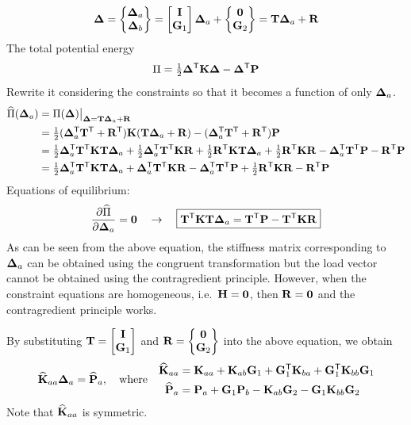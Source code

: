 \begin{equation}
  \bm{\Delta} = \begin{Bmatrix}\bm{\Delta}_a\\ \bm{\Delta}_b\end{Bmatrix} = \begin{bmatrix}\mathbf{I}\\ \mathbf{G}_1\end{bmatrix}\bm{\Delta}_a + \begin{Bmatrix}\mathbf{0}\\ \mathbf{G}_2\end{Bmatrix} = \mathbf{T}\bm{\Delta}_a + \mathbf{R}
\end{equation}
The total potential energy
\begin{equation*}
  \Pi = \tfrac12\bm{\Delta}^{\mathsf{T}}\mathbf{K}\bm{\Delta} - \bm{\Delta}^{\mathsf{T}}\mathbf{P}
\end{equation*}
Rewrite it considering the constraints so that it becomes a function of only $\bm{\Delta}_a$.
{\small\begin{equation*}
  \begin{aligned}
    \widehat\Pi(\bm{\Delta}_a) &= \Pi(\bm{\Delta})\big|_{\bm{\Delta} = \mathbf{T}\bm{\Delta}_a + \mathbf{R}}\\
    &= \tfrac12(\bm{\Delta}_a^{\mathsf{T}}\mathbf{T}^{\mathsf{T}} + \mathbf{R}^{\mathsf{T}})\mathbf{K}(\mathbf{T}\bm{\Delta}_a + \mathbf{R}) - (\bm{\Delta}_a^{\mathsf{T}}\mathbf{T}^{\mathsf{T}} + \mathbf{R}^{\mathsf{T}})\mathbf{P}\\
    &= \tfrac12\bm{\Delta}_a^{\mathsf{T}}\mathbf{T}^{\mathsf{T}}\mathbf{K}\mathbf{T}\bm{\Delta}_a + \tfrac12\bm{\Delta}_a^{\mathsf{T}}\mathbf{T}^{\mathsf{T}}\mathbf{K}\mathbf{R} + \tfrac12\mathbf{R}^{\mathsf{T}}\mathbf{K}\mathbf{T}\bm{\Delta}_a + \tfrac12\mathbf{R}^{\mathsf{T}}\mathbf{K}\mathbf{R} - \bm{\Delta}_a^{\mathsf{T}}\mathbf{T}^{\mathsf{T}}\mathbf{P} - \mathbf{R}^{\mathsf{T}}\mathbf{P}\\
    &= \tfrac12\bm{\Delta}_a^{\mathsf{T}}\mathbf{T}^{\mathsf{T}}\mathbf{K}\mathbf{T}\bm{\Delta}_a + \bm{\Delta}_a^{\mathsf{T}}\mathbf{T}^{\mathsf{T}}\mathbf{K}\mathbf{R} - \bm{\Delta}_a^{\mathsf{T}}\mathbf{T}^{\mathsf{T}}\mathbf{P} + \tfrac12\mathbf{R}^{\mathsf{T}}\mathbf{K}\mathbf{R} - \mathbf{R}^{\mathsf{T}}\mathbf{P}
  \end{aligned}
\end{equation*}}
Equations of equilibrium:
\begin{equation}
  \frac{\partial \widehat\Pi}{\partial \bm{\Delta}_a} = \mathbf{0}\quad\rightarrow\quad \boxed{\mathbf{T}^{\mathsf{T}}\mathbf{K}\mathbf{T}\bm{\Delta}_a = \mathbf{T}^{\mathsf{T}}\mathbf{P} - \mathbf{T}^{\mathsf{T}}\mathbf{K}\mathbf{R}}
\end{equation}
As can be seen from the above equation, the stiffness matrix corresponding to $\bm{\Delta}_a$ can be obtained using the congruent transformation but the load vector cannot be obtained using the contragredient principle. However, when the constraint equations are homogeneous, i.e.\ $\mathbf{H} = \mathbf{0}$, then $\mathbf{R} = \mathbf{0}$ and the contragredient principle works.

By substituting $\mathbf{T} = \begin{bmatrix}\mathbf{I}\\ \mathbf{G}_1\end{bmatrix}$ and $\mathbf{R} = \begin{Bmatrix}\mathbf{0}\\ \mathbf{G}_2\end{Bmatrix}$ into the above equation, we obtain
\begin{equation}
  \widehat{\mathbf{K}}_{aa}\bm{\Delta}_a = \widehat{\mathbf{P}}_a,\quad\text{where}\quad
  \begin{aligned}
    \widehat{\mathbf{K}}_{aa} &= \mathbf{K}_{aa} + \mathbf{K}_{ab}\mathbf{G}_1 + \mathbf{G}_1^{\mathsf{T}}\mathbf{K}_{ba} + \mathbf{G}_1^{\mathsf{T}}\mathbf{K}_{bb}\mathbf{G}_1\\
    \widehat{\mathbf{P}}_a &= \mathbf{P}_a + \mathbf{G}_1\mathbf{P}_b - \mathbf{K}_{ab}\mathbf{G}_2 - \mathbf{G}_1\mathbf{K}_{bb}\mathbf{G}_2
  \end{aligned}
\end{equation}
Note that $\widehat{\mathbf{K}}_{aa}$ is symmetric.

